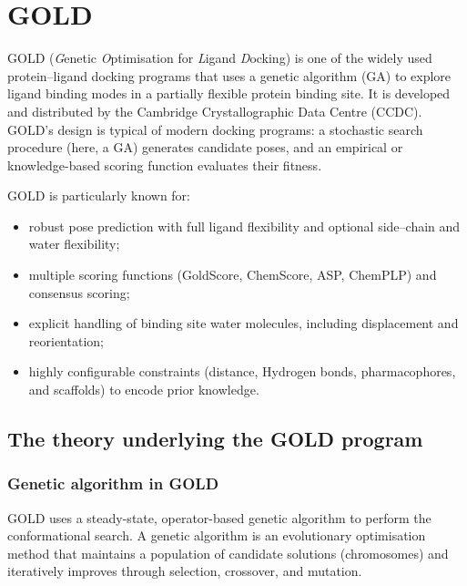 \documentclass[12pt]{article}
\begin{document}
\section{GOLD}

GOLD (\emph{G}enetic \emph{O}ptimisation for \emph{L}igand \emph{D}ocking) is one of the widely used protein--ligand docking programs that uses a genetic algorithm (GA) to explore ligand binding modes in a partially flexible protein binding site\cite{CH7_Jones1997}. It is developed and distributed by the Cambridge Crystallographic Data Centre (CCDC). GOLD's design is typical of modern docking programs: a stochastic search procedure (here, a GA) generates candidate poses, and an empirical or knowledge-based scoring function evaluates their fitness\cite{CH7_Jones1997}.

GOLD is particularly known for:

\begin{itemize}
    \item robust pose prediction with full ligand flexibility and optional side–chain and water flexibility;
    \item multiple scoring functions (GoldScore, ChemScore, ASP, ChemPLP) and consensus scoring;\cite{CH7_Verdonk2003,CH7_Mooij2005}
    \item explicit handling of binding site water molecules, including displacement and reorientation;
    \item highly configurable constraints (distance, Hydrogen bonds, pharmacophores, and scaffolds) to encode prior knowledge.
\end{itemize}

\subsection{The theory underlying the GOLD program}

\subsubsection{Genetic algorithm in GOLD}
GOLD uses a steady-state, operator-based genetic algorithm to perform the conformational search\cite{CH7_Jones1997}. A genetic algorithm is an evolutionary optimisation method that maintains a population of candidate solutions (chromosomes) and iteratively improves through selection, crossover, and mutation.
\end{document}
